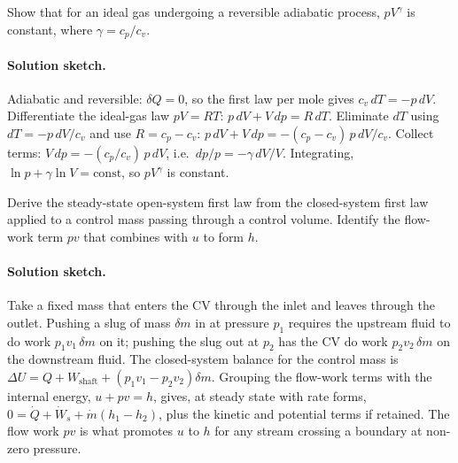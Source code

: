 \begin{exercise}
Show that for an ideal gas undergoing a reversible adiabatic process,
$pV^\gamma$ is constant, where $\gamma = c_p/c_v$.
\paragraph{Solution sketch.} Adiabatic and reversible: $\delta Q = 0$,
so the first law per mole gives $c_v\,dT = -p\,dV$. Differentiate the
ideal-gas law $pV = RT$: $p\,dV + V\,dp = R\,dT$. Eliminate $dT$ using
$dT = -p\,dV/c_v$ and use $R = c_p - c_v$:
$p\,dV + V\,dp = -(c_p - c_v)\,p\,dV/c_v$. Collect terms:
$V\,dp = -(c_p/c_v)\,p\,dV$, i.e.\ $dp/p = -\gamma\,dV/V$. Integrating,
$\ln p + \gamma \ln V = \text{const}$, so $pV^\gamma$ is constant.
\end{exercise}

\begin{exercise}
Derive the steady-state open-system first law from the closed-system
first law applied to a control mass passing through a control volume.
Identify the flow-work term $pv$ that combines with $u$ to form $h$.
\paragraph{Solution sketch.} Take a fixed mass that enters the CV
through the inlet and leaves through the outlet. Pushing a slug of mass
$\delta m$ in at pressure $p_1$ requires the upstream fluid to do work
$p_1 v_1\,\delta m$ on it; pushing the slug out at $p_2$ has the CV do
work $p_2 v_2\,\delta m$ on the downstream fluid. The closed-system
balance for the control mass is $\Delta U = Q + W_{\text{shaft}} +
(p_1 v_1 - p_2 v_2)\delta m$. Grouping the flow-work terms with the
internal energy, $u + pv = h$, gives, at steady state with rate forms,
$0 = \dot{Q} + \dot{W}_s + \dot{m}(h_1 - h_2)$, plus the kinetic and
potential terms if retained. The flow work $pv$ is what promotes $u$ to
$h$ for any stream crossing a boundary at non-zero pressure.
\end{exercise}

